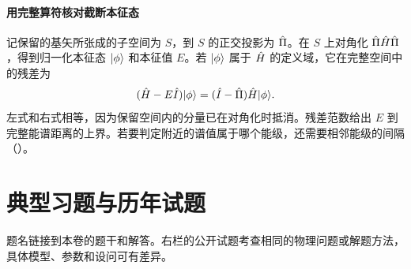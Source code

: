 \paragraph*{用完整算符核对截断本征态}
记保留的基矢所张成的子空间为 $S$，到 $S$ 的正交投影为 $\hat{\Pi}$。在 $S$ 上对角化 $\hat{\Pi}\hat{H}\hat{\Pi}$，得到归一化本征态 $\lvert\phi\rangle$ 和本征值 $E$。若 $\lvert\phi\rangle$ 属于 $\hat{H}$ 的定义域，它在完整空间中的残差为
\[
    (\hat{H} - E\hat{I})\lvert\phi\rangle = (\hat{I} - \hat{\Pi})\hat{H}\lvert\phi\rangle.
\]
左式和右式相等，因为保留空间内的分量已在对角化时抵消。残差范数给出 $E$ 到完整能谱距离的上界。若要判定附近的谱值属于哪个能级，还需要相邻能级的间隔（）。

\section{典型习题与历年试题}
\label{sec:qm-exam-problems}
题名链接到本卷的题干和解答。右栏的公开试题考查相同的物理问题或解题方法，具体模型、参数和设问可有差异。

